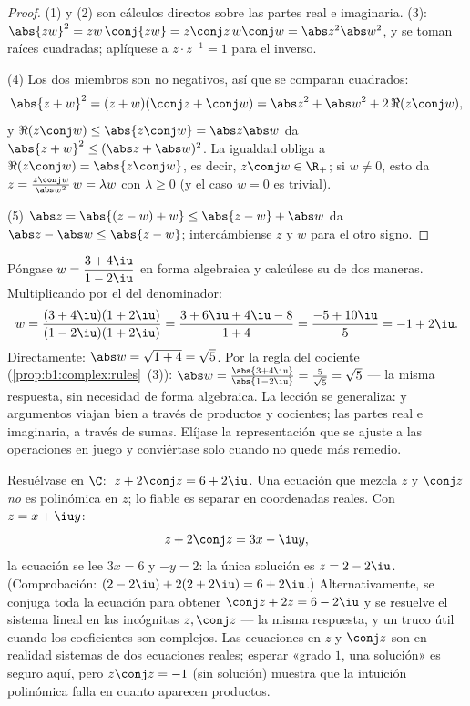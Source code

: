 \begin{proof}
(1) y (2) son cálculos directos sobre las partes real e imaginaria.
(3): $\abs{zw}^2 = zw\,\conj{zw} = z\conj z\, w \conj w = \abs z^2
\abs w^2$, y se toman raíces cuadradas; aplíquese a $z \cdot z^{-1} =
1$ para el inverso.

(4) Los dos miembros son no negativos, así que se comparan cuadrados:
\[
\abs{z+w}^2 = (z+w)(\conj z + \conj w)
= \abs z^2 + \abs w^2 + 2\,\Re(z \conj w),
\]
y $\Re(z\conj w) \leq \abs{z \conj w} = \abs z \abs w$ da
$\abs{z+w}^2 \leq (\abs z + \abs w)^2$. La igualdad obliga a
$\Re(z \conj w) = \abs{z \conj w}$, es decir, $z \conj w \in \R_+$; si
$w \neq 0$, esto da $z = \frac{z\conj w}{\abs w^2}\, w = \lambda w$ con
$\lambda \geq 0$ (y el caso $w = 0$ es trivial).

(5) $\abs z = \abs{(z - w) + w} \leq \abs{z-w} + \abs w$ da
$\abs z - \abs w \leq \abs{z - w}$; intercámbiense $z$ y $w$ para el otro signo.
\end{proof}

\begin{example}\label{ex:b1:complex:workout}
Póngase $w = \dfrac{3 + 4\iu}{1 - 2\iu}$ en forma algebraica y
calcúlese su  de dos maneras. Multiplicando por el
 del denominador:
\[
w = \frac{(3 + 4\iu)(1 + 2\iu)}{(1 - 2\iu)(1 + 2\iu)}
= \frac{3 + 6\iu + 4\iu - 8}{1 + 4}
= \frac{-5 + 10\iu}{5} = -1 + 2\iu .
\]
Directamente: $\abs w = \sqrt{1 + 4} = \sqrt5$. Por la regla del
cociente (\cref{prop:b1:complex:rules}~(3)): $\abs w = \frac{\abs{3 +
4\iu}}{\abs{1 - 2\iu}} = \frac5{\sqrt5} = \sqrt5$ --- la misma
respuesta, sin necesidad de forma algebraica. La lección se
generaliza:  y argumentos viajan bien a través de productos y
cocientes; las partes real e imaginaria, a través de sumas. Elíjase la
representación que se ajuste a las operaciones en juego y conviértase
solo cuando no quede más remedio.
\end{example}

\begin{example}\label{ex:b1:complex:conjeq}
Resuélvase en $\C$: $\;z + 2\conj z = 6 + 2\iu$. Una ecuación que mezcla
$z$ y $\conj z$ \emph{no} es polinómica en $z$; lo fiable es separar en
coordenadas reales. Con $z = x + \iu y$:
\[
z + 2\conj z = 3x - \iu y ,
\]
la ecuación se lee $3x = 6$ y $-y = 2$: la única solución es
$z = 2 - 2\iu$. (Comprobación: $(2 - 2\iu) + 2(2 + 2\iu) = 6 + 2\iu$.)
Alternativamente, se conjuga toda la ecuación para obtener
$\conj z + 2z = 6 - 2\iu$ y se resuelve el sistema lineal en las
incógnitas $z, \conj z$ --- la misma respuesta, y un truco útil cuando
los coeficientes son complejos. Las ecuaciones en $z$ y $\conj z$ son
en realidad sistemas de dos ecuaciones reales; esperar «grado $1$, una
solución» es seguro aquí, pero $z\conj z = -1$ (sin solución) muestra
que la intuición polinómica falla en cuanto aparecen productos.
\end{example}


